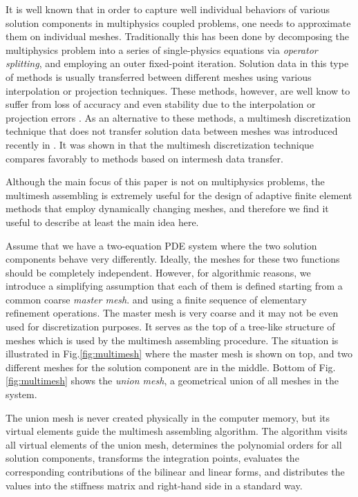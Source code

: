 \documentclass[final,3p,times,twocolumn]{elsarticle}
\begin{document}
It is well known that in order to capture well individual behaviors 
of various solution components in multiphysics coupled problems, 
one needs to approximate them on individual meshes. 
Traditionally this has been done by decomposing the multiphysics 
problem into a series of single-physics equations via {\em operator 
splitting}, and employing an outer fixed-point iteration. 
Solution data in this type of methods is 
usually transferred between different meshes using various 
interpolation or projection techniques. These methods, however, 
are well know to suffer from loss of accuracy and even stability 
due to the interpolation or projection errors \cite{jiao}. As an 
alternative to these methods, a multimesh discretization technique 
that does not transfer solution data between meshes
was introduced recently in \cite{spacetime-1,spacetime-2}. It was shown 
in \cite{dubcova} that the multimesh discretization technique
compares favorably to methods based on intermesh data transfer.
 

Although the main focus of this paper is not on multiphysics problems, the 
multimesh assembling is extremely useful for the design 
of adaptive finite element methods that employ dynamically 
changing meshes, and therefore we find it useful to describe 
at least the main idea here. 

Assume that we have a two-equation PDE
system where the two solution components behave very differently. 
Ideally, the meshes for these two functions should be completely 
independent. However, for algorithmic reasons, we introduce a simplifying 
assumption that each of them is defined starting from a common coarse 
{\em master mesh}. and using a finite sequence of elementary refinement 
operations. The master mesh is very coarse and it may not  
be even used for discretization purposes. It serves as the top of 
a tree-like structure of meshes which is used by the multimesh 
assembling procedure. The situation is illustrated in Fig.\ref{fig:multimesh}
where the master mesh is shown on top, and two different meshes for the solution 
component are in the middle. Bottom of Fig.\ref{fig:multimesh} shows the 
{\em union mesh}, a geometrical union of all meshes in the system. 

The union mesh is never created physically in the computer memory, but its 
virtual elements guide the 
multimesh assembling algorithm. The algorithm visits all virtual elements 
of the union mesh, determines the polynomial orders for all solution components, 
transforms the integration points, evaluates the corresponding contributions 
of the bilinear and linear forms, and distributes the values into 
the stiffness matrix and right-hand side in a standard way.
\end{document}
